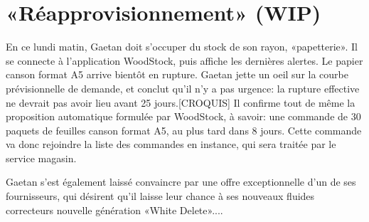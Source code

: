 \section{«Réapprovisionnement» (WIP)}

En ce lundi matin, Gaetan doit s'occuper du stock de son rayon, «papetterie».
Il se connecte à l'application WoodStock, puis affiche les dernières alertes.
Le papier canson format A5 arrive bientôt en rupture.
Gaetan jette un oeil sur la courbe prévisionnelle de demande, et conclut qu'il n'y a pas urgence: la rupture effective ne devrait pas avoir lieu avant 25 jours.[CROQUIS]
Il confirme tout de même la proposition automatique formulée par WoodStock, à savoir: une commande de 30 paquets de feuilles canson format A5, au plus tard dans 8 jours.
Cette commande va donc rejoindre la liste des commandes en instance, qui sera traitée par le service magasin.
\par
Gaetan s'est également laissé convaincre par une offre exceptionnelle d'un de ses fournisseurs, qui désirent qu'il laisse leur chance à ses nouveaux fluides correcteurs nouvelle génération «White Delete»....
